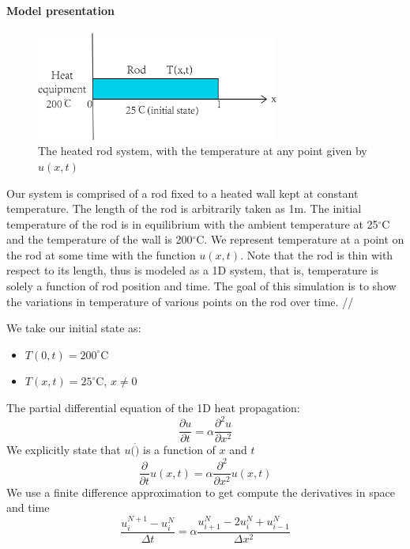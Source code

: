 

\paragraph{Model presentation}

\begin{figure}[htb]
	\centering
	\includegraphics[width=8cm]{Figures/Heat1D_model.png}       
	\caption{The heated rod system, with the temperature at any point given by $u(x,t)$ }
	\label{fig:toto}
\end{figure}

Our system is comprised of a rod fixed to a heated wall kept at constant temperature. The length of the rod is arbitrarily taken as 1m. The initial temperature of the rod is in equilibrium with the ambient temperature at 25$^{\circ} $C and the temperature of the wall is 200$^{\circ} $C.  We represent temperature at a point on the rod at some time with the function $u(x,t)$. Note that the rod is thin with respect to its length, thus is modeled as a 1D system, that is, temperature is solely a function of rod position and time. The goal of this simulation is to show the variations in temperature of various points on the rod over time. //

We take our initial state as:
\begin{itemize}
	\item $T(0,t)=200 ^{\circ}$C
    \item $T(x,t)=25 ^{\circ}$C, $x\ne 0$
\end{itemize}

\noindent The partial differential equation of the 1D heat propagation:
\begin{equation}
 \frac{\partial u}{\partial t} = \alpha \frac{\partial^2 u}{\partial x^2}
\end{equation}
\noindent We explicitly state that $u(\dot)$ is a function of $x$ and $t$
\begin{equation}
 \frac{\partial} {\partial t}u(x,t) = \alpha \frac{\partial^2}{\partial x^2}u(x,t)
\end{equation}
\noindent We use a finite difference approximation to get compute the derivatives in space and time
\begin{equation}
\frac{u_{i}^{N+1}-u_{i}^{N}}{\Delta t} =\alpha\frac{u_{i+1}^{N}-2u_{i}^{N}+u_{i-1}^{N}}{\Delta x^2}
\end{equation}

